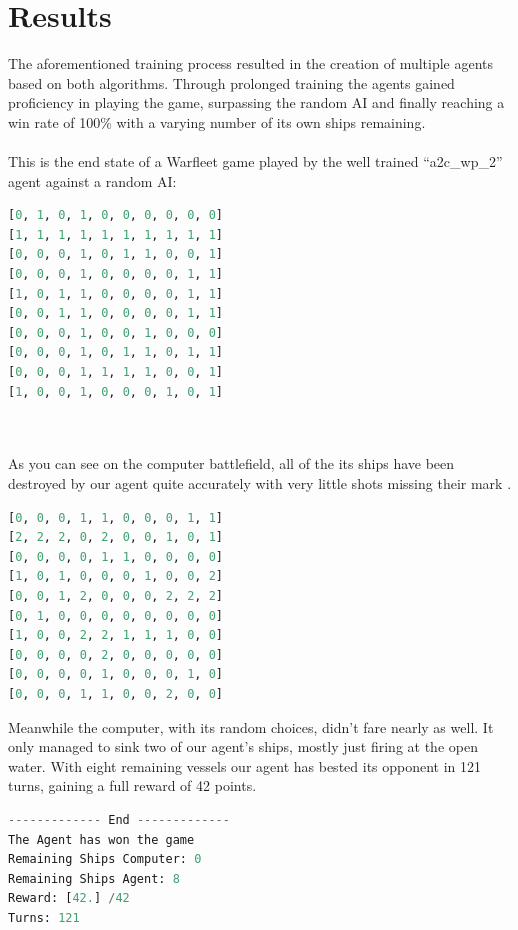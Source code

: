 \documentclass[sigconf]{acmart}
\begin{document}
\section{Results}
The aforementioned training process resulted in the creation of multiple agents based on both algorithms. Through prolonged training the agents gained proficiency in playing the game, surpassing the random AI and finally reaching a win rate of 100\% with a varying number of its own ships remaining.
 \\
 \\
This is the end state of a Warfleet game played by the well trained ``a2c\_wp\_2'' agent against a random AI:

\begin{lstlisting}[language=Python, caption=Computer battlefield end-state]
[0, 1, 0, 1, 0, 0, 0, 0, 0, 0]
[1, 1, 1, 1, 1, 1, 1, 1, 1, 1]
[0, 0, 0, 1, 0, 1, 1, 0, 0, 1]
[0, 0, 0, 1, 0, 0, 0, 0, 1, 1]
[1, 0, 1, 1, 0, 0, 0, 0, 1, 1] 
[0, 0, 1, 1, 0, 0, 0, 0, 1, 1] 
[0, 0, 0, 1, 0, 0, 1, 0, 0, 0] 
[0, 0, 0, 1, 0, 1, 1, 0, 1, 1] 
[0, 0, 0, 1, 1, 1, 1, 0, 0, 1] 
[1, 0, 0, 1, 0, 0, 0, 1, 0, 1] 
\end{lstlisting}
\\
\\
As you can see on the computer battlefield, all of the its ships have been destroyed by our agent quite accurately with very little shots missing their mark .
\begin{lstlisting}[language=Python, caption=Agent battlefield end-state]
[0, 0, 0, 1, 1, 0, 0, 0, 1, 1]
[2, 2, 2, 0, 2, 0, 0, 1, 0, 1]
[0, 0, 0, 0, 1, 1, 0, 0, 0, 0] 
[1, 0, 1, 0, 0, 0, 1, 0, 0, 2]
[0, 0, 1, 2, 0, 0, 0, 2, 2, 2]
[0, 1, 0, 0, 0, 0, 0, 0, 0, 0]
[1, 0, 0, 2, 2, 1, 1, 1, 0, 0]
[0, 0, 0, 0, 2, 0, 0, 0, 0, 0]
[0, 0, 0, 0, 1, 0, 0, 0, 1, 0]
[0, 0, 0, 1, 1, 0, 0, 2, 0, 0]
\end{lstlisting}
Meanwhile the computer, with its random choices, didn't fare nearly as well. It only managed to sink two of our agent's ships, mostly just firing at the open water.
With eight remaining vessels our agent has bested its opponent in 121 turns, gaining a full reward of 42 points.
\\
\begin{lstlisting}[language=Python, caption=Game information]
------------- End -------------
The Agent has won the game
Remaining Ships Computer: 0
Remaining Ships Agent: 8
Reward: [42.] /42
Turns: 121
\end{lstlisting}
\\
\end{document}
